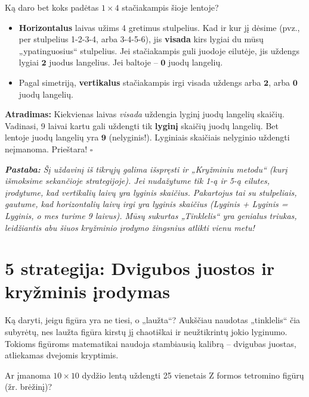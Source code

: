\documentclass[11pt,a4paper]{scrartcl}
\newenvironment{solution}
    {\begin{list}{}{\setlength{\leftmargin}{10pt}\setlength{\rightmargin}{10pt}}\item[]}
    {\end{list}}
\begin{document}
\begin{solution}
Ką daro bet koks padėtas $1 \times 4$ stačiakampis šioje lentoje?
\begin{itemize}
    \item \textbf{Horizontalus} laivas užims 4 gretimus stulpelius. Kad ir kur jį dėsime (pvz., per stulpelius 1-2-3-4, arba 3-4-5-6), jis \textbf{visada} kirs lygiai du mūsų „ypatinguosius“ stulpelius. Jei stačiakampis guli juodoje eilutėje, jis uždengs lygiai $\mathbf{2}$ juodus langelius. Jei baltoje – $\mathbf{0}$ juodų langelių.
    \item Pagal simetriją, \textbf{vertikalus} stačiakampis irgi visada uždengs arba $\mathbf{2}$, arba $\mathbf{0}$ juodų langelių.
\end{itemize}

\textbf{Atradimas:} Kiekvienas laivas \textit{visada} uždengia lyginį juodų langelių skaičių. Vadinasi, 9 laivai kartu gali uždengti tik \textbf{lyginį} skaičių juodų langelių. Bet lentoje juodų langelių yra $\mathbf{9}$ (nelyginis!). Lyginiais skaičiais nelyginio uždengti neįmanoma. Prieštara! \hfill $\square$

\vspace{0.3cm}
\textit{\textbf{Pastaba:} Šį uždavinį iš tikrųjų galima išspręsti ir „Kryžminiu metodu“ (kurį išmoksime sekančioje strategijoje). Jei nudažytume tik 1-ą ir 5-ą eilutes, įrodytume, kad vertikalių laivų yra lyginis skaičius. Pakartojus tai su stulpeliais, gautume, kad horizontalių laivų irgi yra lyginis skaičius (Lyginis + Lyginis = Lyginis, o mes turime 9 laivus). Mūsų sukurtas „Tinklelis“ yra genialus triukas, leidžiantis abu šiuos kryžminio įrodymo žingsnius atlikti vienu metu!}
\end{solution}

\vspace{0.5cm}
\section{5 strategija: Dvigubos juostos ir kryžminis įrodymas}

Ką daryti, jeigu figūra yra ne tiesi, o „laužta“? Aukščiau naudotas „tinklelis“ čia subyrėtų, nes laužta figūra kirstų jį chaotiškai ir neužtikrintų jokio lyginumo. Tokioms figūroms matematikai naudoja stambiausią kalibrą – dvigubas juostas, atliekamas dvejomis kryptimis.

\begin{example}
Ar įmanoma $10 \times 10$ dydžio lentą uždengti 25 vienetais Z formos tetromino figūrų (žr. brėžinį)?
\end{example}
\end{document}
